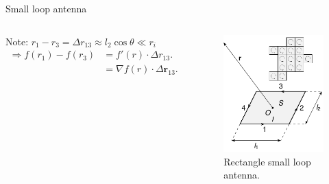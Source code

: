 \begin{frame}{Small loop antenna}
\begin{columns}
        \vspace{3mm}
        Note: \( r_1-r_3 = \Delta r_{13} \approx l_2 \cos \theta \ll r_i \)
        \begin{align*}
            \Rightarrow f(r_1) - f(r_3) &= f'(r) \cdot \Delta r_{13}. \\
            &= \nabla f(r) \cdot \Delta \mathbf{r}_{13}.
        \end{align*}
        \vspace{-8mm}
        \begin{figure}
            \centering
            \includegraphics[width=\textwidth]{Figures/Small_loop.pdf}
            \caption{Rectangle small loop antenna.}
            \label{fig:small_loop}
        \end{figure}
    \end{columns}
\end{frame}